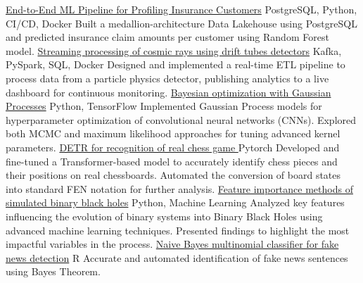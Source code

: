\documentclass[9pt]{developercv} %
\begin{document}
\begin{entrylist}
    
    \entry
        {}
        {\href{https://github.com/XRD-Group/End-To-End-ML-pipeline-for-profiling-insurance-customers}{End-to-End ML Pipeline for Profiling Insurance Customers}}
        {PostgreSQL, Python, CI/CD, Docker}
        {Built a medallion-architecture Data Lakehouse using PostgreSQL and predicted insurance claim amounts per customer using Random Forest model.}
    \entry
		{}
		{\href{https://github.com/bhroben/Streaming-processing-of-cosmic-rays-using-drift-tubes-detectors}{Streaming processing of cosmic rays using drift tubes detectors}}
		{Kafka, PySpark, SQL, Docker}
		{Designed and implemented a real-time ETL pipeline to process data from a particle physics detector, publishing analytics to a live dashboard for continuous monitoring.}
    \entry
		{}
		{\href{https://github.com/bhroben/Bayesian-Optimization-with-Gaussian-Process}{Bayesian optimization with Gaussian Processes}}
		{Python, TensorFlow}
		{Implemented Gaussian Process models for hyperparameter optimization of convolutional neural networks (CNNs). Explored both MCMC and maximum likelihood approaches for tuning advanced kernel parameters.}
    \entry
        {}
        {\href{https://github.com/bhroben/DETR-for-recognition-of-real-chess-game}{DETR for recognition of real chess game }}
        {Pytorch}
        {
            Developed and fine-tuned a Transformer-based model to accurately identify chess pieces and their positions on real chessboards. Automated the conversion of board states into standard FEN notation for further analysis.}
    \entry
		{}
		{\href{https://github.com/bhroben/Feature-importance-methods-of-simulated-binary-black-holes}{Feature importance methods of simulated binary black holes}}
		{Python, Machine Learning}
        {Analyzed key features influencing the evolution of binary systems into Binary Black Holes using advanced machine learning techniques. Presented findings to highlight the most impactful variables in the process.}
	\entry
		{}
		{\href{https://github.com/bhroben/Naive-Bayes-multinomial-classifier-for-fake-news-detection}{Naive Bayes multinomial classifier for fake news detection}}
		{R}
		{%
        Accurate and automated identification of fake news sentences using Bayes Theorem.}


\end{entrylist}
\end{document}
